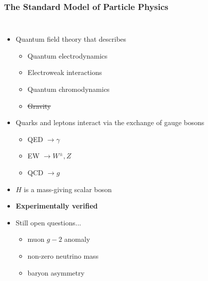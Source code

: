 \begin{frame}
  \frametitle{\textbf{The Standard Model of Particle Physics}}
  \begin{columns}
    \begin{itemize}
    \item Quantum field theory that describes
      \begin{itemize}
      \item Quantum electrodynamics
      \item Electroweak interactions
      \item Quantum chromodynamics
      \item \st{Gravity}
      \end{itemize}
    \item Quarks and leptons interact via the exchange of gauge bosons
      \begin{itemize}
      \item QED $\to \gamma$
      \item EW $\to W^{\pm}, Z$
      \item QCD $\to g$
      \end{itemize}
    \item $H$ is a mass-giving scalar boson
    \item \textbf{Experimentally verified}
    \item Still open questions...
      \begin{itemize}
      \item muon $g-2$ anomaly
      \item non-zero neutrino mass
      \item baryon asymmetry
      \end{itemize}
    \end{itemize}
  \end{columns}
\end{frame}

